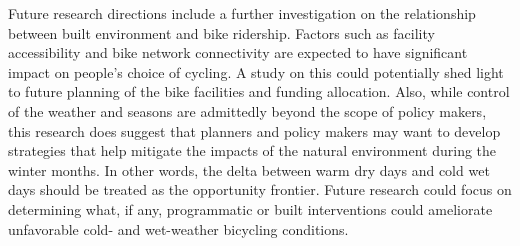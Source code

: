 \documentclass [11pt, proquest] {uwthesis}[2015/03/03]
\begin{document}
Future research directions include a further investigation on the relationship between built environment and bike ridership. Factors such as facility accessibility and bike network connectivity are expected to have significant impact on people's choice of cycling. A study on this could potentially shed light to future planning of the bike facilities and funding allocation. Also, while control of the weather and seasons are admittedly beyond the scope of policy makers,
this research does suggest that planners and policy makers may want to develop strategies that help mitigate the impacts of the natural environment during the winter months. In other words, the delta between warm dry days and cold wet days should be treated as the opportunity frontier. Future research could focus on determining what, if any, programmatic or built interventions could ameliorate unfavorable cold- and wet-weather bicycling conditions.


%
%



%
%
\appendix
\raggedbottom\sloppy
 
 
 


\end{document}
